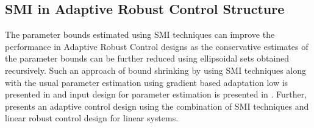 \subsection{SMI in Adaptive Robust Control Structure}

The parameter bounds estimated using SMI techniques can improve the performance in Adaptive Robust Control designs as
the conservative estimates of the parameter bounds can be further reduced using ellipsoidal sets obtained recursively.
Such an approach of bound shrinking by using SMI techniques along with the usual parameter estimation using gradient
based adaptation low is presented in \cite{lu2009set} and input design for parameter estimation is presented in
\cite{lu2010experimental}. Further, \cite{kosut1992set} presents an adaptive control design using the combination of SMI
techniques and linear robust control design for linear systems.

